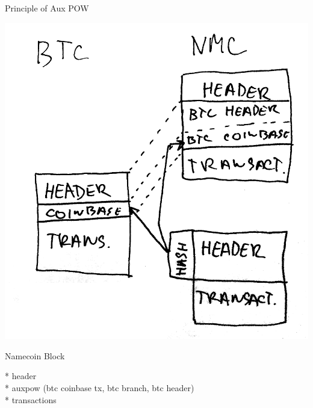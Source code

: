 \documentclass{beamer}
\begin{document}
\begin{frame}

    {\Huge Principle of Aux POW}\\

\end{frame}

\begin{frame}

    \includegraphics[scale=0.185]{img/principle_of_auxpow}

\end{frame}

\begin{frame}

    {\Huge Namecoin Block}\\

    \vspace{5mm}

    * header\\
    * auxpow (btc coinbase tx, btc branch, btc header)\\
    * transactions\\



\end{frame}
\end{document}
